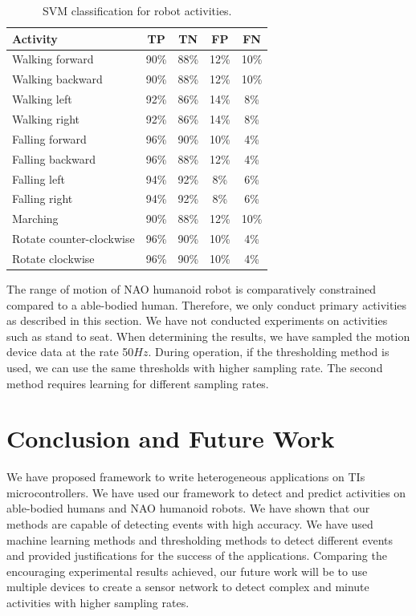 \documentclass[letterpaper]{article}
\begin{document}
\begin{table}[!ht]
\caption{SVM classification for robot activities.}
	\label{tab:robot-svm-class}
	\centering
		\begin{tabular} {| l | c | c | c | c | }
		\hline
			{\bf Activity} & {\bf  TP}  &	{\bf TN}  &	{\bf FP} &	{\bf FN} \\ 
\hline
			Walking forward	& 90\%	& 88\%	& 12\%	& 10\% \\ \hline
			Walking backward	& 90\%	& 88\%	& 12\%	& 10\% \\ \hline
			Walking left	& 92\%	& 86\%	& 14\%	& 8\% \\ \hline
			Walking right	& 92\%	& 86\%	& 14\%	& 8\% \\ \hline
			Falling forward	& 96\%	& 90\%	& 10\%	& 4\%	 \\ \hline
			Falling backward	& 96\%	& 88\%	& 12\%	& 4\%	 \\ \hline
			Falling left	& 94\%	& 92\%	& 8\%	& 6\%	 \\ \hline
			Falling right	& 94\%	& 92\%	& 8\%	& 6\%	 \\ \hline
			Marching	& 90\%	& 88\%	& 12\%	& 10\%	 \\ \hline
			Rotate counter-clockwise	& 96\%	& 90\%	& 10\%	& 4\%	 \\ \hline
			Rotate clockwise	& 96\%	& 90\%	& 10\%	& 4\%	 \\ \hline
		\end{tabular}
\end{table}

The range of motion of NAO humanoid robot is comparatively constrained compared to a able-bodied 
human. Therefore, we only conduct primary activities as described in this section. We have not 
conducted experiments on activities such as stand to seat. When determining the results, we 
have sampled the motion device data at the rate 50$Hz$. During operation, if the 
thresholding method is used, we can use the same thresholds with higher sampling rate. The second 
method requires learning for different sampling rates.



\section{Conclusion and Future Work}

We have proposed framework to write heterogeneous applications on TIs microcontrollers. We have used 
our framework to detect and predict activities on able-bodied humans and NAO humanoid robots. We 
have shown that our methods are capable of detecting events with high accuracy. We have used 
machine learning methods and thresholding methods to detect different events and provided 
justifications for the success of the applications. Comparing the encouraging experimental results 
achieved, our future work will be to use multiple devices to create a sensor network to detect 
complex and minute activities with higher sampling rates.  



\end{document}
